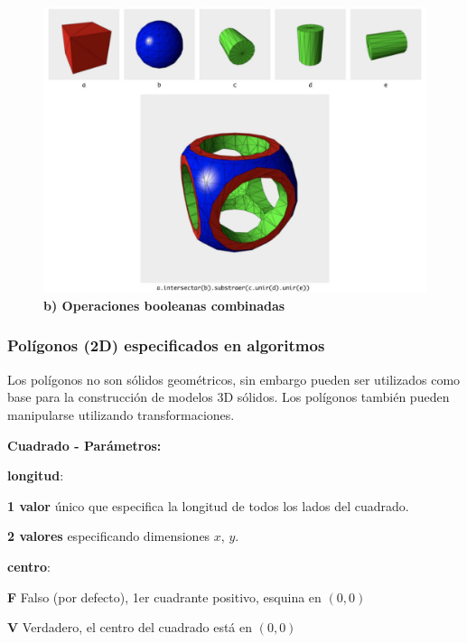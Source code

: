\begin{figure}[h]
\includegraphics[width=16cm]{Img/Modelos/modelado16a.jpg}
\centering
\caption{\textbf{ \footnotesize{b) Operaciones booleanas combinadas }}}
\label{bCSG}
\end{figure}
\clearpage

\subsubsection{Polígonos (2D) especificados en algoritmos}
Los polígonos no son sólidos geométricos, sin embargo pueden ser utilizados como base para la construcción de modelos 3D sólidos. Los polígonos también pueden manipularse utilizando transformaciones.

\begin{description}
\item  \textbf{Cuadrado - Parámetros:}
\item   \textbf{longitud}:
\begin{description}
\item \textbf{1 valor} único que especifica la longitud de todos los lados del cuadrado.
\item \textbf{2 valores} especificando dimensiones $x$, $y$.
\end{description}
\item   \textbf{centro}:
\begin{description}
\item \textbf{F} Falso (por defecto), 1er cuadrante positivo, esquina en $(0, 0)$
\item \textbf{V} Verdadero, el centro del cuadrado está en $(0, 0)$
\end{description}
\end{description}

